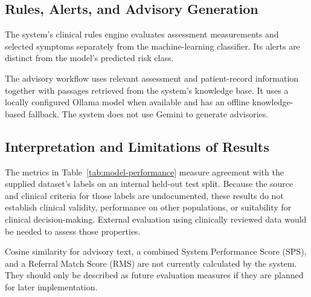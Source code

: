 \subsection{Rules, Alerts, and Advisory Generation}

The system's clinical rules engine evaluates assessment measurements and
selected symptoms separately from the machine-learning classifier. Its
alerts are distinct from the model's predicted risk class.

The advisory workflow uses relevant assessment and patient-record
information together with passages retrieved from the system's knowledge
base. It uses a locally configured Ollama model when available and has an
offline knowledge-based fallback. The system does not use Gemini to
generate advisories.

\subsection{Interpretation and Limitations of Results}

The metrics in Table~\ref{tab:model-performance} measure agreement with
the supplied dataset's labels on an internal held-out test split. Because
the source and clinical criteria for those labels are undocumented, these
results do not establish clinical validity, performance on other
populations, or suitability for clinical decision-making. External
evaluation using clinically reviewed data would be needed to assess
those properties.

Cosine similarity for advisory text, a combined System Performance Score
(SPS), and a Referral Match Score (RMS) are not currently calculated by
the system. They should only be described as future evaluation measures
if they are planned for later implementation.
